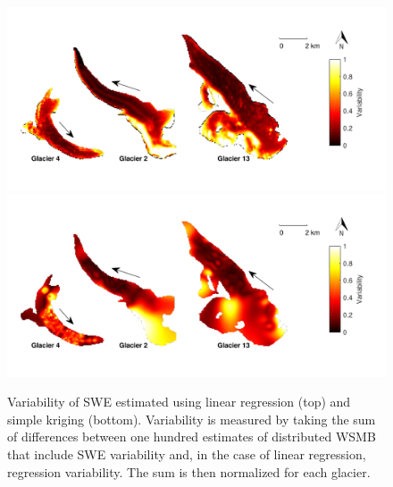 \documentclass[twocolumn,letterpaper]{igs}
\begin{document}
\begin{figure}
	\centering
	\includegraphics[width =\textwidth]{SpatialVar_LR.pdf}\\
	\includegraphics[width =\textwidth]{SpatialVar_SK.pdf}\\
	\caption{Variability of SWE estimated using linear regression (top) and simple kriging (bottom).	Variability is measured by taking the sum of differences between one hundred estimates of distributed WSMB that include SWE variability and, in the case of linear regression, regression variability. The sum is then normalized for each glacier.}
	\label{fig:WSMBspatialvar}
\end{figure}



\end{document}
